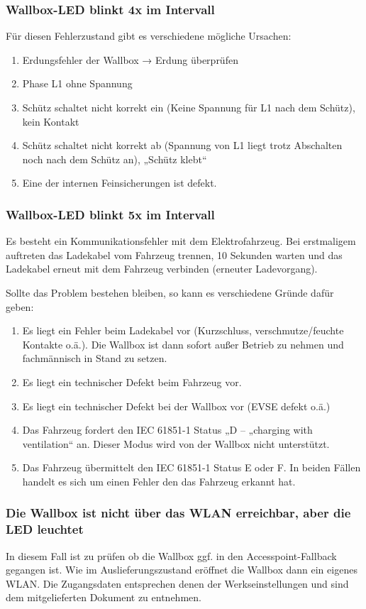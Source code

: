 \documentclass[a4paper,10pt]{article}
\begin{document}
\begin{multicols*}{2}
	\subsubsection*{Wallbox-LED blinkt 4x im Intervall}
	Für diesen Fehlerzustand gibt es verschiedene mögliche Ursachen:
	\begin{enumerate}
		\item Erdungsfehler der Wallbox → Erdung überprüfen
		\item Phase L1 ohne Spannung
		\item Schütz schaltet nicht korrekt ein (Keine Spannung für L1 nach dem Schütz), kein
		      Kontakt
		\item Schütz schaltet nicht korrekt ab (Spannung von L1 liegt trotz Abschalten noch
		      nach dem Schütz an), „Schütz klebt“
		\item Eine der internen Feinsicherungen ist defekt.
	\end{enumerate}

	\subsubsection*{Wallbox-LED blinkt 5x im Intervall}
	Es besteht ein Kommunikationsfehler mit dem Elektrofahrzeug. Bei erstmaligem
	auftreten das Ladekabel vom Fahrzeug trennen, 10 Sekunden warten und das
	Ladekabel erneut mit dem Fahrzeug verbinden (erneuter Ladevorgang).

	Sollte das Problem bestehen bleiben, so kann es verschiedene Gründe dafür
	geben:
	\begin{enumerate}
		\item Es liegt ein Fehler beim Ladekabel vor (Kurzschluss, verschmutze/feuchte
		      Kontakte o.ä.). Die Wallbox ist dann sofort außer Betrieb zu nehmen und
		      fachmännisch in Stand zu setzen.
		\item Es liegt ein technischer Defekt beim Fahrzeug vor.
		\item Es liegt ein technischer Defekt bei der Wallbox vor (EVSE defekt o.ä.)
		\item Das Fahrzeug fordert den IEC 61851-1 Status „D – „charging with ventilation“
		      an. Dieser Modus wird von der Wallbox nicht unterstützt.
		\item Das Fahrzeug übermittelt den IEC 61851-1 Status E oder F. In beiden Fällen
		      handelt es sich um einen Fehler den das Fahrzeug erkannt hat.
	\end{enumerate}

	\subsubsection*{Die Wallbox ist nicht über das WLAN erreichbar, aber die LED leuchtet}
	In diesem Fall ist zu prüfen ob die Wallbox ggf. in den Accesspoint-Fallback
	gegangen ist. Wie im Auslieferungszustand eröffnet die Wallbox dann ein eigenes
	WLAN. Die Zugangsdaten entsprechen denen der Werkseinstellungen und sind dem
	mitgelieferten Dokument zu entnehmen.


\end{multicols*}
\end{document}
